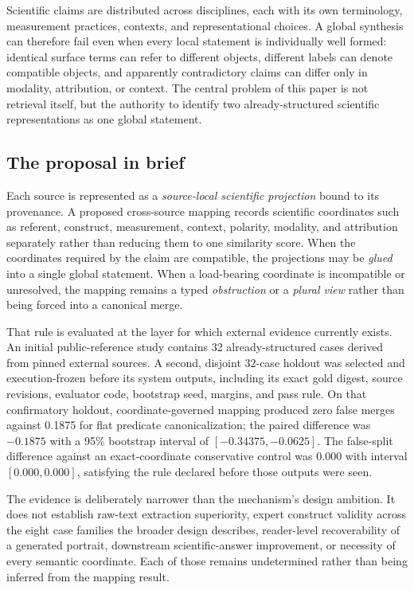 Scientific claims are distributed across disciplines, each with its own
terminology, measurement practices, contexts, and representational choices.
A global synthesis can therefore fail even when every local statement is
individually well formed: identical surface terms can refer to different
objects, different labels can denote compatible objects, and apparently
contradictory claims can differ only in modality, attribution, or context.
The central problem of this paper is not retrieval itself, but the authority
to identify two already-structured scientific representations as one global
statement.

\subsection{The proposal in brief}

Each source is represented as a \emph{source-local scientific projection}
bound to its provenance. A proposed cross-source mapping records scientific
coordinates such as referent, construct, measurement, context, polarity,
modality, and attribution separately rather than reducing them to one
similarity score. When the coordinates required by the claim are compatible,
the projections may be \emph{glued} into a single global statement. When a
load-bearing coordinate is incompatible or unresolved, the mapping remains a
typed \emph{obstruction} or a \emph{plural view} rather than being forced into
a canonical merge.

That rule is evaluated at the layer for which external evidence currently
exists. An initial public-reference study contains 32 already-structured cases
derived from pinned external sources. A second, disjoint 32-case holdout was
selected and execution-frozen before its system outputs, including its exact
gold digest, source revisions, evaluator code, bootstrap seed, margins, and
pass rule. On that confirmatory holdout, coordinate-governed mapping produced
zero false merges against 0.1875 for flat predicate canonicalization; the
paired difference was $-0.1875$ with a 95\% bootstrap interval of
$[-0.34375,-0.0625]$. The false-split difference against an exact-coordinate
conservative control was $0.000$ with interval $[0.000,0.000]$, satisfying the
rule declared before those outputs were seen.

The evidence is deliberately narrower than the mechanism's design ambition.
It does not establish raw-text extraction superiority, expert construct
validity across the eight case families the broader design describes,
reader-level recoverability of a generated portrait, downstream
scientific-answer improvement, or necessity of every semantic coordinate.
Each of those remains undetermined rather than being inferred from the mapping
result.

